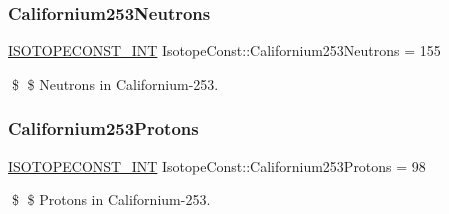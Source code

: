 \subsubsection{\texorpdfstring{Californium253\+Neutrons}{Californium253Neutrons}}
{\footnotesize\ttfamily \mbox{\hyperlink{group___isotope_const-_macros_ga5f18360b3e99483a35c32d789e62621c}{I\+S\+O\+T\+O\+P\+E\+C\+O\+N\+S\+T\+\_\+\+I\+NT}} Isotope\+Const\+::\+Californium253\+Neutrons = 155}

\$ \$ Neutrons in Californium-\/253. \mbox{\label{group___isotope_const-_californium-_cf253_gaba1384bf2bb9e2b896abdcdd3e05f17f}} 
\subsubsection{\texorpdfstring{Californium253\+Protons}{Californium253Protons}}
{\footnotesize\ttfamily \mbox{\hyperlink{group___isotope_const-_macros_ga5f18360b3e99483a35c32d789e62621c}{I\+S\+O\+T\+O\+P\+E\+C\+O\+N\+S\+T\+\_\+\+I\+NT}} Isotope\+Const\+::\+Californium253\+Protons = 98}

\$ \$ Protons in Californium-\/253. 
